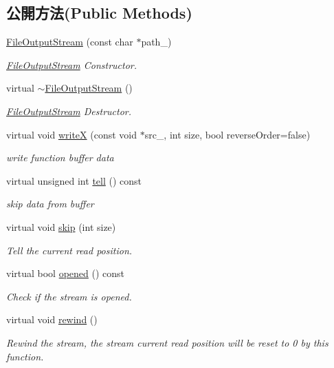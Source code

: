 \subsection*{公開方法(Public Methods)}
\begin{DoxyCompactItemize}
\item 
\hyperlink{class_i_dream_sky_1_1_file_output_stream_a1ac1e55d601670564d5b0b4c0a1f5f8a}{File\+Output\+Stream} (const char $\ast$path\+\_\+)
\begin{DoxyCompactList}\small\item\em \hyperlink{class_i_dream_sky_1_1_file_output_stream}{File\+Output\+Stream} Constructor. \end{DoxyCompactList}\item 
virtual \hyperlink{class_i_dream_sky_1_1_file_output_stream_aa0423041bf20194144689440ed94ade3}{$\sim$\+File\+Output\+Stream} ()
\begin{DoxyCompactList}\small\item\em \hyperlink{class_i_dream_sky_1_1_file_output_stream}{File\+Output\+Stream} Destructor. \end{DoxyCompactList}\item 
virtual void \hyperlink{class_i_dream_sky_1_1_file_output_stream_ab3d24c893812e35318b3a535880465fb}{writeX} (const void $\ast$src\+\_\+, int size, bool reverse\+Order=false)
\begin{DoxyCompactList}\small\item\em write function buffer data \end{DoxyCompactList}\item 
virtual unsigned int \hyperlink{class_i_dream_sky_1_1_file_output_stream_a8ea8902dfc78e6c48a171ef6d9a5ef25}{tell} () const 
\begin{DoxyCompactList}\small\item\em skip data from buffer \end{DoxyCompactList}\item 
virtual void \hyperlink{class_i_dream_sky_1_1_file_output_stream_a1d0294f4ece89e18dc9d9e7535b5a9cc}{skip} (int size)
\begin{DoxyCompactList}\small\item\em Tell the current read position. \end{DoxyCompactList}\item 
virtual bool \hyperlink{class_i_dream_sky_1_1_file_output_stream_afcb041ab2dd146a2ba38dd0fb1b53f37}{opened} () const 
\begin{DoxyCompactList}\small\item\em Check if the stream is opened. \end{DoxyCompactList}\item 
virtual void \hyperlink{class_i_dream_sky_1_1_file_output_stream_ae3b49aa7a6a37581a17284bf6015839b}{rewind} ()
\begin{DoxyCompactList}\small\item\em Rewind the stream, the stream current read position will be reset to 0 by this function. \end{DoxyCompactList}\end{DoxyCompactItemize}

